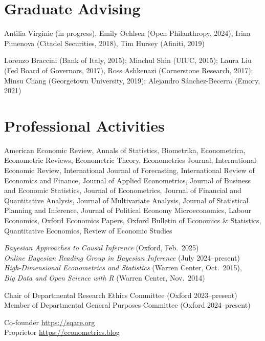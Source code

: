 \documentclass[line,overlapped]{myres}
\begin{document}
\begin{resume}
\section{\sc Graduate Advising}
\begin{description}[style=multiline,leftmargin=3cm,font=\normalfont]
  \item[Main or Joint Supervisor:] Antilia Virginie (in progress), Emily Oehlsen (Open Philanthropy, 2024), Irina Pimenova (Citadel Securities, 2018), Tim Hursey (Afiniti, 2019)
  \item[Committee \\ Member:] Lorenzo Braccini (Bank of Italy, 2015); Minchul Shin (UIUC, 2015); Laura Liu (Fed Board of Governors, 2017), Ross Ashkenazi (Cornerstone Research, 2017); Minsu Chang (Georgetown University, 2019); Alejandro S\'{a}nchez-Becerra (Emory, 2021)
\end{description}


\section{\sc Professional Activities}

\begin{description}[style=multiline,leftmargin=3cm,font=\normalfont]
  \item[Refereeing:] American Economic Review, Annals of Statistics, Biometrika, Econometrica, Econometric Reviews, Econometric Theory, Econometrics Journal, International Economic Review, International Journal of Forecasting, International Review of Economics and Finance, Journal of Applied Econometrics, Journal of Business and Economic Statistics, Journal of Econometrics, Journal of Financial and Quantitative Analysis, Journal of Multivariate Analysis, Journal of Statistical Planning and Inference, Journal of Political Economy Microeconomics, Labour Economics, Oxford Economics Papers, Oxford Bulletin of Economics \& Statistics, Quantitative Economics, Review of Economic Studies 
  \item[Workshops \\ Organized:]
    \emph{Bayesian Approaches to Causal Inference} (Oxford, Feb.\ 2025)\\
    \emph{Online Bayesian Reading Group in Bayesian Inference} (July 2024--present)\\
    \emph{High-Dimensional Econometrics and Statistics} (Warren Center, Oct.\ 2015), \\
    \emph{Big Data and Open Science with R} (Warren Center, Nov.\ 2014)
  \item[Service:] Chair of Departmental Research Ethics Committee (Oxford 2023--present)\\ Member of Departmental General Purposes Committee (Oxford 2024--present) 
  \item[Miscellaneous:] Co-founder \url{https://sqare.org}\\ Proprietor \url{https://econometrics.blog}
\end{description}




\end{resume}
\end{document}
